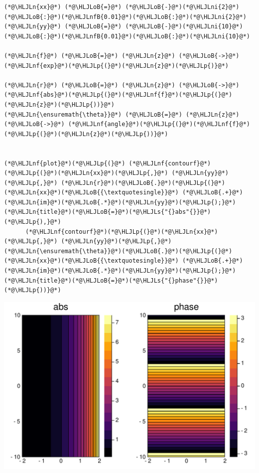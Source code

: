 \documentclass[12pt,a4paper]{article}
\newcommand{\HLJLn}[1]{#1}
\newcommand{\HLJLnf}[1]{\textcolor[RGB]{66,102,213}{#1}}
\newcommand{\HLJLs}[1]{\textcolor[RGB]{201,61,57}{#1}}
\newcommand{\HLJLnfB}[1]{\textcolor[RGB]{59,151,46}{#1}}
\newcommand{\HLJLni}[1]{\textcolor[RGB]{59,151,46}{#1}}
\newcommand{\HLJLoB}[1]{\textcolor[RGB]{102,102,102}{\textbf{#1}}}
\newcommand{\HLJLp}[1]{#1}
\begin{document}
\begin{lstlisting}
(*@\HLJLn{xx}@*) (*@\HLJLoB{=}@*) (*@\HLJLoB{-}@*)(*@\HLJLni{2}@*)(*@\HLJLoB{:}@*)(*@\HLJLnfB{0.01}@*)(*@\HLJLoB{:}@*)(*@\HLJLni{2}@*)
(*@\HLJLn{yy}@*) (*@\HLJLoB{=}@*) (*@\HLJLoB{-}@*)(*@\HLJLni{10}@*)(*@\HLJLoB{:}@*)(*@\HLJLnfB{0.01}@*)(*@\HLJLoB{:}@*)(*@\HLJLni{10}@*)

(*@\HLJLn{f}@*) (*@\HLJLoB{=}@*) (*@\HLJLn{z}@*) (*@\HLJLoB{->}@*) (*@\HLJLnf{exp}@*)(*@\HLJLp{(}@*)(*@\HLJLn{z}@*)(*@\HLJLp{)}@*)

(*@\HLJLn{r}@*) (*@\HLJLoB{=}@*) (*@\HLJLn{z}@*) (*@\HLJLoB{->}@*) (*@\HLJLnf{abs}@*)(*@\HLJLp{(}@*)(*@\HLJLnf{f}@*)(*@\HLJLp{(}@*)(*@\HLJLn{z}@*)(*@\HLJLp{))}@*)
(*@\HLJLn{\ensuremath{\theta}}@*) (*@\HLJLoB{=}@*) (*@\HLJLn{z}@*) (*@\HLJLoB{->}@*) (*@\HLJLnf{angle}@*)(*@\HLJLp{(}@*)(*@\HLJLnf{f}@*)(*@\HLJLp{(}@*)(*@\HLJLn{z}@*)(*@\HLJLp{))}@*)


(*@\HLJLnf{plot}@*)(*@\HLJLp{(}@*) (*@\HLJLnf{contourf}@*)(*@\HLJLp{(}@*)(*@\HLJLn{xx}@*)(*@\HLJLp{,}@*) (*@\HLJLn{yy}@*)(*@\HLJLp{,}@*) (*@\HLJLn{r}@*)(*@\HLJLoB{.}@*)(*@\HLJLp{(}@*)(*@\HLJLn{xx}@*)(*@\HLJLoB{{\textquotesingle}}@*) (*@\HLJLoB{.+}@*) (*@\HLJLn{im}@*)(*@\HLJLoB{.*}@*)(*@\HLJLn{yy}@*)(*@\HLJLp{);}@*) (*@\HLJLn{title}@*)(*@\HLJLoB{=}@*)(*@\HLJLs{"{}abs"{}}@*)(*@\HLJLp{),}@*)
      (*@\HLJLnf{contourf}@*)(*@\HLJLp{(}@*)(*@\HLJLn{xx}@*)(*@\HLJLp{,}@*) (*@\HLJLn{yy}@*)(*@\HLJLp{,}@*) (*@\HLJLn{\ensuremath{\theta}}@*)(*@\HLJLoB{.}@*)(*@\HLJLp{(}@*)(*@\HLJLn{xx}@*)(*@\HLJLoB{{\textquotesingle}}@*) (*@\HLJLoB{.+}@*) (*@\HLJLn{im}@*)(*@\HLJLoB{.*}@*)(*@\HLJLn{yy}@*)(*@\HLJLp{);}@*) (*@\HLJLn{title}@*)(*@\HLJLoB{=}@*)(*@\HLJLs{"{}phase"{}}@*)(*@\HLJLp{))}@*)
\end{lstlisting}

\includegraphics[width=\linewidth]{figures/Lecture1_3_1.pdf}
\end{document}
